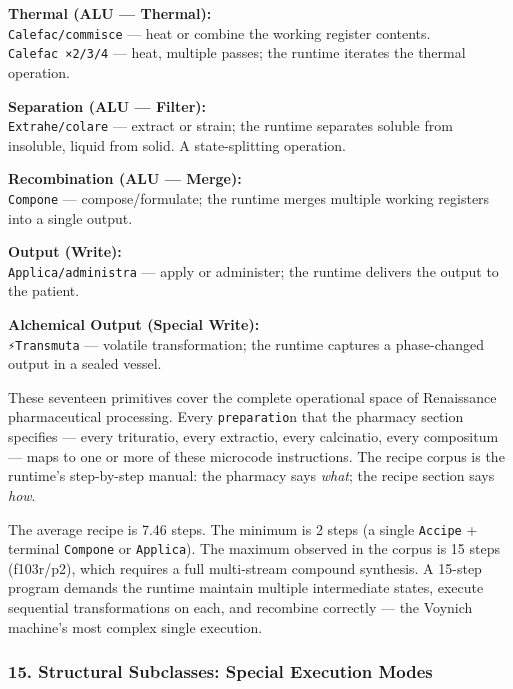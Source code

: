 \textbf{Thermal (ALU --- Thermal):}\\
\texttt{Calefac/commisce} --- heat or combine the working register
contents.\\
\texttt{Calefac\ ×2/3/4} --- heat, multiple passes; the runtime iterates
the thermal operation.

\textbf{Separation (ALU --- Filter):}\\
\texttt{Extrahe/colare} --- extract or strain; the runtime separates
soluble from insoluble, liquid from solid. A state-splitting operation.

\textbf{Recombination (ALU --- Merge):}\\
\texttt{Compone} --- compose/formulate; the runtime merges multiple
working registers into a single output.

\textbf{Output (Write):}\\
\texttt{Applica/administra} --- apply or administer; the runtime
delivers the output to the patient.

\textbf{Alchemical Output (Special Write):}\\
\texttt{⚡Transmuta} --- volatile transformation; the runtime captures a
phase-changed output in a sealed vessel.

These seventeen primitives cover the complete operational space of
Renaissance pharmaceutical processing. Every \texttt{preparatio}n that
the pharmacy section specifies --- every trituratio, every extractio,
every calcinatio, every compositum --- maps to one or more of these
microcode instructions. The recipe corpus is the runtime's step-by-step
manual: the pharmacy says \emph{what}; the recipe section says
\emph{how}.

The average recipe is 7.46 steps. The minimum is 2 steps (a single
\texttt{Accipe} + terminal \texttt{Compone} or \texttt{Applica}). The
maximum observed in the corpus is 15 steps (f103r/p2), which requires a
full multi-stream compound synthesis. A 15-step program demands the
runtime maintain multiple intermediate states, execute sequential
transformations on each, and recombine correctly --- the Voynich
machine's most complex single execution.

\hypertarget{structural-subclasses-special-execution-modes}{%
\subsubsection{15. Structural Subclasses: Special Execution
Modes}\label{structural-subclasses-special-execution-modes}}

